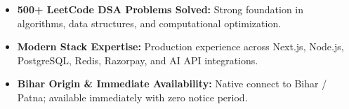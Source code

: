 \documentclass[a4paper,10pt]{article}
\begin{document}
\begin{itemize}

    \item \textbf{500+ LeetCode DSA Problems Solved:} Strong foundation in algorithms, data structures, and computational optimization.

    \item \textbf{Modern Stack Expertise:} Production experience across Next.js, Node.js, PostgreSQL, Redis, Razorpay, and AI API integrations.

    \item \textbf{Bihar Origin \& Immediate Availability:} Native connect to Bihar / Patna; available immediately with zero notice period.

\end{itemize}

\end{document}
